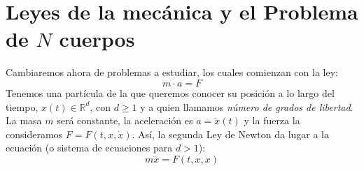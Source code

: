\chapter{Leyes de la mecánica y el Problema de $N$ cuerpos}
\noindent
Cambiaremos ahora de problemas a estudiar, los cuales comienzan con la ley:
\begin{equation*}
    m\cdot a = F
\end{equation*}
Tenemos una partícula de la que queremos conocer su posición a lo largo del tiempo, $x(t)\in \mathbb{R}^d$, con $d\geq 1$ y a quien llamamos \textit{número de grados de libertad}. La masa $m$ será constante, la aceleración es $a = \ddot{x}(t)$ y la fuerza la consideramos $F = F(t,x,\dot{x})$. Así, la segunda Ley de Newton da lugar a la ecuación (o sistema de ecuaciones para $d>1$):
\begin{equation*}
    m\ddot{x} = F(t,x,\dot{x})
\end{equation*}

